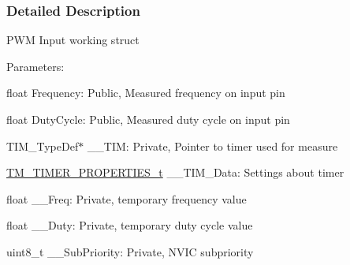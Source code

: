 \subsubsection{Detailed Description}
P\+W\+M Input working struct

Parameters\+:
\begin{DoxyItemize}
\item float Frequency\+: Public, Measured frequency on input pin
\item float Duty\+Cycle\+: Public, Measured duty cycle on input pin
\begin{DoxyItemize}
\item T\+I\+M\+\_\+\+Type\+Def$\ast$ \+\_\+\+\_\+\+T\+I\+M\+: Private, Pointer to timer used for measure
\item \hyperlink{struct_t_m___t_i_m_e_r___p_r_o_p_e_r_t_i_e_s__t}{T\+M\+\_\+\+T\+I\+M\+E\+R\+\_\+\+P\+R\+O\+P\+E\+R\+T\+I\+E\+S\+\_\+t} \+\_\+\+\_\+\+T\+I\+M\+\_\+\+Data\+: Settings about timer
\item float \+\_\+\+\_\+\+Freq\+: Private, temporary frequency value
\item float \+\_\+\+\_\+\+Duty\+: Private, temporary duty cycle value
\item uint8\+\_\+t \+\_\+\+\_\+\+Sub\+Priority\+: Private, N\+V\+I\+C subpriority 
\end{DoxyItemize}
\end{DoxyItemize}
